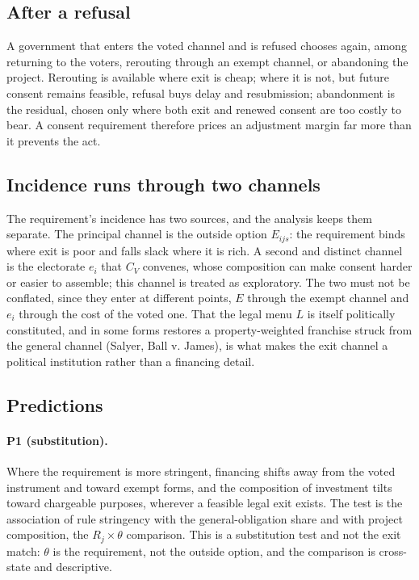\subsection{After a refusal}

A government that enters the voted channel and is refused chooses again, among
returning to the voters, rerouting through an exempt channel, or abandoning the
project. Rerouting is available where exit is cheap; where it is not, but
future consent remains feasible, refusal buys delay and resubmission;
abandonment is the residual, chosen only where both exit and renewed consent
are too costly to bear. A consent requirement therefore prices an adjustment
margin far more than it prevents the act.

\subsection{Incidence runs through two channels}

The requirement's incidence has two sources, and the analysis keeps them
separate. The principal channel is the outside option $E_{ijs}$: the
requirement binds where exit is poor and falls slack where it is rich. A second
and distinct channel is the electorate $e_i$ that $C_V$ convenes, whose
composition can make consent harder or easier to assemble; this channel is
treated as exploratory. The two must not be conflated, since they enter at
different points, $E$ through the exempt channel and $e_i$ through the cost of
the voted one. That the legal menu $L$ is itself politically constituted, and
in some forms restores a property-weighted franchise struck from the general
channel (Salyer, Ball v. James), is what makes the exit channel a political
institution rather than a financing detail.

\subsection{Predictions}

\paragraph{P1 (substitution).}
Where the requirement is more stringent, financing shifts away from the voted
instrument and toward exempt forms, and the composition of investment tilts
toward chargeable purposes, wherever a feasible legal exit exists. The test is
the association of rule stringency with the general-obligation share and with
project composition, the $R_j \times \theta$ comparison. This is a substitution
test and not the exit match: $\theta$ is the requirement, not the outside
option, and the comparison is cross-state and descriptive.


